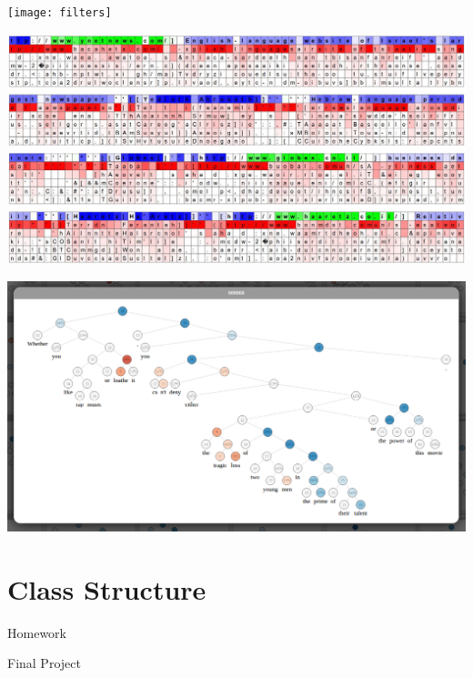 \documentclass{beamer}
\begin{document}
\begin{frame}
  \begin{center}
    \texttt{[image: filters]}
  \end{center}
\end{frame}


\begin{frame}
  \begin{center}
    \includegraphics[width=\textwidth]{lstm1}
  \end{center}
\end{frame}


\begin{frame}
  \begin{center}
    \includegraphics[width=\textwidth]{sentiment}
  \end{center}
\end{frame}


\section{Class Structure}

\begin{frame}
  
\end{frame}

\begin{frame}{Homework}
  
\end{frame}


\begin{frame}{Final Project}
  
\end{frame}
\end{document}

